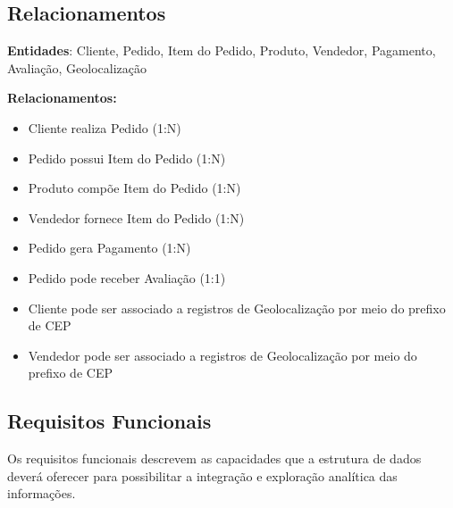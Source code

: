 \documentclass[12pt,a4paper]{article}
\begin{document}
\subsection{Relacionamentos}

\textbf{Entidades}: Cliente, Pedido, Item do Pedido, Produto, Vendedor, Pagamento, Avaliação, Geolocalização

\textbf{Relacionamentos:}

\begin{itemize}
    \item Cliente realiza Pedido (1:N)
    \item Pedido possui Item do Pedido (1:N)
    \item Produto compõe Item do Pedido (1:N)
    \item Vendedor fornece Item do Pedido (1:N)
    \item Pedido gera Pagamento (1:N)
    \item Pedido pode receber Avaliação (1:1)
    \item Cliente pode ser associado a registros de Geolocalização por meio do prefixo de CEP
    \item Vendedor pode ser associado a registros de Geolocalização por meio do prefixo de CEP
\end{itemize}

\clearpage
\subsection{Requisitos Funcionais}

Os requisitos funcionais descrevem as capacidades que a estrutura de dados deverá oferecer para possibilitar a integração e exploração analítica das informações.
\end{document}
